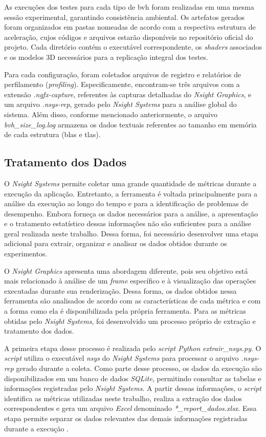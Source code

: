 As execuções dos testes para cada tipo de \gls{bvh} foram realizadas em uma mesma sessão experimental, garantindo consistência ambiental. Os artefatos gerados foram organizados em pastas nomeadas de acordo com a respectiva estrutura de aceleração, cujos códigos e arquivos estarão disponíveis no repositório oficial do projeto. Cada diretório contém o executável correspondente, os \textit{shaders} associados e os modelos 3D necessários para a replicação integral dos testes.

Para cada configuração, foram coletados arquivos de registro e relatórios de perfilamento (\textit{profiling}). Especificamente, encontram-se três arquivos com a extensão \textit{.ngfx-capture}, referentes às capturas detalhadas do \textit{Nsight Graphics}, e um arquivo \textit{.nsys-rep}, gerado pelo \textit{Nsight Systems} para a análise global do sistema. Além disso, conforme mencionado anteriormente, o arquivo \textit{bvh\_size\_log.log} armazena os dados textuais referentes ao tamanho em memória de cada estrutura (\gls{blas} e \gls{tlas}).

\subsection{Tratamento dos Dados}

O \textit{Nsight Systems} permite coletar uma grande quantidade de métricas durante a execução da aplicação. Entretanto, a ferramenta é voltada principalmente para a análise da execução ao longo do tempo e para a identificação de problemas de desempenho. Embora forneça os dados necessários para a análise, a apresentação e o tratamento estatístico dessas informações não são suficientes para a análise geral realizada neste trabalho. Dessa forma, foi necessário desenvolver uma etapa adicional para extrair, organizar e analisar os dados obtidos durante os experimentos.

O \textit{Nsight Graphics} apresenta uma abordagem diferente, pois seu objetivo está mais relacionado à análise de um \textit{frame} específico e à visualização das operações executadas durante sua renderização. Dessa forma, os dados obtidos nessa ferramenta são analisados de acordo com as características de cada métrica e com a forma como ela é disponibilizada pela própria ferramenta. Para as métricas obtidas pelo \textit{Nsight Systems}, foi desenvolvido um processo próprio de extração e tratamento dos dados.

A primeira etapa desse processo é realizada pelo \textit{script Python} \textit{extrair\_nsys.py}. O \textit{script} utiliza o executável \textit{nsys} do \textit{Nsight Systems} para processar o arquivo \textit{.nsys-rep} gerado durante a coleta. Como parte desse processo, os dados da execução são disponibilizados em um banco de dados \textit{SQLite}, permitindo consultar as tabelas e informações registradas pelo \textit{Nsight Systems}. A partir dessas informações, o \textit{script} identifica as métricas utilizadas neste trabalho, realiza a extração dos dados correspondentes e gera um arquivo \textit{Excel} denominado \textit{*\_report\_dados.xlsx}. Essa etapa permite separar os dados relevantes das demais informações registradas durante a execução \cite{nsight_systems_post_collection}.

